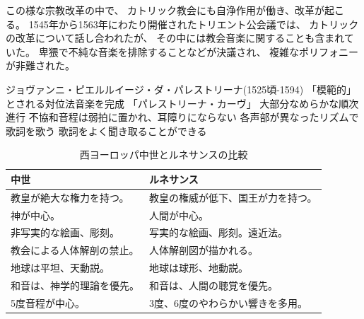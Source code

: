 \documentclass[a4j]{jarticle}
\begin{document}
この様な宗教改革の中で、
カトリック教会にも自浄作用が働き、改革が起こる。
1545年から1563年にわたり開催されたトリエント公会議では、
カトリックの改革について話し合われたが、
その中には教会音楽に関することも含まれていた。
卑猥で不純な音楽を排除することなどが決議され、
複雑なポリフォニーが非難された。

ジョヴァンニ・ピエルルイージ・ダ・パレストリーナ(1525頃-1594)
「模範的」とされる対位法音楽を完成
「パレストリーナ・カーヴ」
大部分なめらかな順次進行
不協和音程は弱拍に置かれ、耳障りにならない
各声部が異なったリズムで歌詞を歌う
歌詞をよく聞き取ることができる


\begin{table}[tb]
 \begin{center}
  \caption{西ヨーロッパ中世とルネサンスの比較}
  \label{tab:comparison}
  \begin{tabular}{|l|l|} \hline
  中世                       & ルネサンス                         \\
  \hline \hline
  教皇が絶大な権力を持つ。   & 教皇の権威が低下、国王が力を持つ。 \\ \hline
  神が中心。                 & 人間が中心。                       \\ \hline
  非写実的な絵画、彫刻。     & 写実的な絵画、彫刻。遠近法。       \\ \hline
  教会による人体解剖の禁止。 & 人体解剖図が描かれる。             \\ \hline
  地球は平坦、天動説。       & 地球は球形、地動説。               \\ \hline
  和音は、神学的理論を優先。 & 和音は、人間の聴覚を優先。         \\
  5度音程が中心。            & 3度、6度のやわらかい響きを多用。   \\ \hline
  \end{tabular}
 \end{center}
\end{table}
\end{document}
